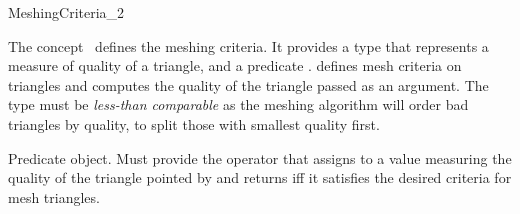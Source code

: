 \begin{ccRefConcept}{MeshingCriteria_2}

\ccDefinition

The concept \ccRefName\ defines the meshing criteria. It provides a type
 that represents a measure of quality of a triangle, and a
predicate .   defines mesh criteria on triangles
and computes the quality of the triangle passed as an argument. The type
 must be \emph{less-than comparable} as the meshing algorithm
will order bad triangles by quality, to split those with smallest quality
first.

\ccTypes



 {Predicate object. Must provide the operator
   that assigns to 
  a value measuring the quality of the triangle pointed by  and
  returns  iff it satisfies the desired criteria for mesh
  triangles.}




\ccHasModels
{}\\

\end{ccRefConcept}

